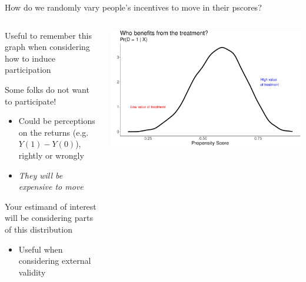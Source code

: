 \documentclass[notes,11pt, aspectratio=169]{beamer}
\newenvironment{wideitemize}{\itemize\addtolength{\itemsep}{10pt}}{\enditemize}
\begin{document}
\begin{frame}{How do we randomly vary people's incentives to move in their pscores?}
\begin{columns}[T] %
\begin{column}{.54\textwidth}
  \begin{wideitemize}
  \item Useful to remember this graph when considering how to induce participation
  \item Some folks do not want to participate! 
    \begin{itemize}
    \item Could be perceptions on the returns (e.g. $Y(1) - Y(0)$), rightly or wrongly
    \item \emph{They will be expensive to move}
    \end{itemize}
  \item Your estimand of interest will be considering parts of this distribution
    \begin{itemize}
    \item Useful when considering external validity
    \end{itemize}
  \end{wideitemize}
\end{column}%
\hfill%
\begin{column}{.5\textwidth}
\includegraphics[width=\linewidth]{images/overlap3.pdf}
\end{column}%
\end{columns}
\end{frame}
\end{document}
